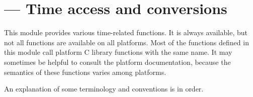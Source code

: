\section{ ---
         Time access and conversions}



This module provides various time-related functions.  It is always
available, but not all functions are available on all platforms.  Most
of the functions defined in this module call platform C library
functions with the same name.  It may sometimes be helpful to consult
the platform documentation, because the semantics of these functions
varies among platforms.

An explanation of some terminology and conventions is in order.

